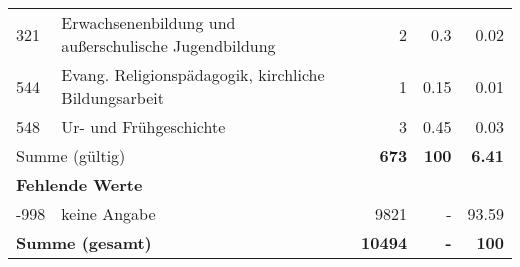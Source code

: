 \begin{longtable}{lXrrr}
        321 & \multicolumn{1}{X}{Erwachsenenbildung und außerschulische Jugendbildung} & %
          \num{2} &
          \num[round-mode=places,round-precision=2]{0,3} &
          \num[round-mode=places,round-precision=2]{0,02} \\

        544 & \multicolumn{1}{X}{Evang. Religionspädagogik, kirchliche Bildungsarbeit} & %
          \num{1} &
          \num[round-mode=places,round-precision=2]{0,15} &
          \num[round-mode=places,round-precision=2]{0,01} \\

        548 & \multicolumn{1}{X}{Ur- und Frühgeschichte} & %
          \num{3} &
          \num[round-mode=places,round-precision=2]{0,45} &
          \num[round-mode=places,round-precision=2]{0,03} \\

     \midrule
     \multicolumn{2}{l}{Summe (gültig)} &
       \textbf{\num{673}} &
     \textbf{100} &
       \textbf{\num[round-mode=places,round-precision=2]{6,41}} \\
     \multicolumn{5}{l}{\textbf{Fehlende Werte}}\\
       -998 &
       keine Angabe &
         \num{9821} &
        - &
         \num[round-mode=places,round-precision=2]{93,59} \\
     \midrule
     \multicolumn{2}{l}{\textbf{Summe (gesamt)}} &
          \textbf{\num{10494}} &
        \textbf{-} &
        \textbf{100} \\
     \bottomrule
     \end{longtable}
     
